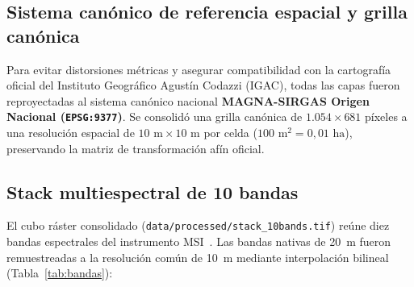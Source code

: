 \documentclass[11pt,a4paper]{article}
\begin{document}
\subsection{Sistema canónico de referencia espacial y grilla canónica}
Para evitar distorsiones métricas y asegurar compatibilidad con la cartografía oficial del Instituto Geográfico Agustín Codazzi (IGAC), todas las capas fueron reproyectadas al sistema canónico nacional \textbf{MAGNA-SIRGAS Origen Nacional (\texttt{EPSG:9377})}. Se consolidó una grilla canónica de $1.054 \times 681$ píxeles a una resolución espacial de $10\text{ m} \times 10\text{ m}$ por celda ($100\text{ m}^2 = 0,01\text{ ha}$), preservando la matriz de transformación afín oficial.

\subsection{Stack multiespectral de 10 bandas}
El cubo ráster consolidado (\texttt{data/processed/stack\_10bands.tif}) reúne diez bandas espectrales del instrumento MSI~\cite{lillesand2015}. Las bandas nativas de 20~m fueron remuestreadas a la resolución común de 10~m mediante interpolación bilineal (Tabla~\ref{tab:bandas}):
\end{document}
